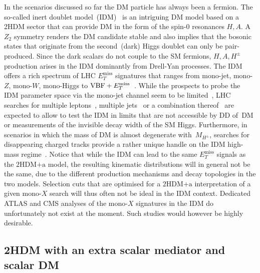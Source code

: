 \documentclass[a4paper, 11pt,notoc]{article}
\newcommand{\MET}{\ensuremath{E_T^\mathrm{miss}}\xspace}
\newcommand{\hdma}{\ensuremath{\textrm{2HDM+a}}\xspace}
\begin{document}
In the scenarios discussed so far the DM particle has always been a fermion. The so-called inert doublet model~(IDM)~\cite{Deshpande:1977rw,Barbieri:2006dq,Cao:2007rm} is an intriguing DM model based on a 2HDM sector that can provide DM in the form of the spin-0 resonances $H, A$.  A $Z_2$ symmetry renders the DM candidate stable and also implies  that the bosonic states  that originate from the second~(dark) Higgs doublet can only be pair-produced. Since the dark scalars do not couple to the SM fermions, $H,A,H^\pm$ production arises in the IDM dominantly from Drell-Yan processes. The IDM offers a rich spectrum of LHC $\MET$ signatures that ranges from mono-jet, mono-$Z$, mono-$W$, mono-Higgs to  ${\rm VBF}+\MET$~\cite{Dolle:2009ft,Miao:2010rg,Gustafsson:2012aj,Belanger:2015kga,Ilnicka:2015jba,Poulose:2016lvz,Datta:2016nfz,Hashemi:2016wup,deFlorian:2016spz,Belyaev:2016lok,Dutta:2017lny,Wan:2018eaz}.  While the prospects to probe the IDM parameter space via the mono-jet channel seem to be limited~\cite{Belyaev:2016lok}, LHC searches for multiple leptons~\cite{Dolle:2009ft,Miao:2010rg,Gustafsson:2012aj,Belanger:2015kga,Datta:2016nfz,Hashemi:2016wup}, multiple jets~\cite{Poulose:2016lvz,Dutta:2017lny}  or a combination thereof~\cite{Hashemi:2016wup,Wan:2018eaz} are expected to allow to test the IDM in limits that are not accessible by DD of~DM or measurements of the invisible decay width of the SM Higgs. Furthermore, in scenarios in which the mass of DM is almost degenerate with~$M_{H^\pm}$, searches for disappearing charged tracks provide a rather unique handle on the IDM high-mass regime~\cite{Belyaev:2016lok}. {\color{red} Notice that while the IDM can lead to the same $\MET$ signals  as the \hdma model, the resulting kinematic distributions will in general not be the same, due to the different production mechanisms and decay topologies in the two models.} Selection cuts that are optimised for a \hdma interpretation of a given mono-$X$ search will thus often not be ideal in the IDM context. Dedicated ATLAS and CMS  analyses of the mono-$X$ signatures in the IDM do unfortunately not exist at the moment. Such studies would however be highly desirable.

\subsection*{2HDM with an extra scalar mediator and scalar DM}
\end{document}
